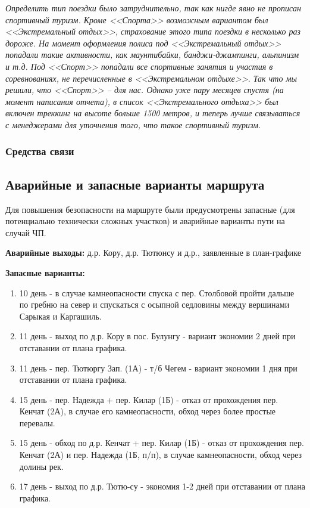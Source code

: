 			\textit{Определить тип поездки было затруднительно, так как нигде явно не прописан спортивный туризм.
			Кроме <<Спорта>> возможным вариантом был <<Экстремальный отдых>>, страхование этого типа поездки в
			несколько раз дороже. На момент оформления полиса под <<Экстремальный отдых>> попадали такие активности,
			как маунтибайки, банджи-джампинги, альпинизм и т.д. Под <<Спорт>> попадали все спортивные занятия и
			участия в соревнованиях, не перечисленные в <<Экстремальном отдыхе>>. Так что мы решили, что
			<<Спорт>> -- для нас. Однако уже пару месяцев спустя (на момент написания отчета), в список
			<<Экстремального отдыха>> был включен треккинг на высоте больше 1500 метров, и теперь лучше связываться
			с менеджерами для уточнения того, что такое спортивный туризм.}

		\subsubsection{Средства связи}
			

	\subsection{Аварийные и запасные варианты маршрута}
		Для повышения безопасности на маршруте были предусмотрены запасные (для потенциально технически сложных участков) и 
		аварийные варианты пути  на случай ЧП.

		\textbf{Аварийные выходы: } д.р. Кору, д.р. Тютюнсу и д.р., заявленные в план-графике

		\textbf{Запасные варианты: }			\begin{enumerate}
				\item 10 день - в случае камнеопасности спуска с пер. Столбовой пройти дальше по гребню на север и спускаться с осыпной седловины между вершинами Сарыкая и Каргашиль.
				\item 11 день - выход по д.р. Кору в пос. Булунгу - вариант экономии 2 дней при отставании от плана графика.
				\item 11 день - пер. Тютюргу Зап. (1А) - т/б Чегем - вариант экономии 1 дня при отставании от плана графика.
				\item 15 день - пер. Надежда + пер. Килар (1Б) - отказ от прохождения пер. Кенчат (2А), в случае его камнеопасности, обход через более простые перевалы.
				\item 15 день - обход по д.р. Кенчат + пер. Килар (1Б) - отказ от прохождения пер. Кенчат (2А) и пер. Надежда (1Б, п/п), в случае камнеопасности, обход через долины рек.
				\item 17 день - выход по д.р. Тютю-су - экономия 1-2 дней при отставании от плана графика.
			\end{enumerate}

